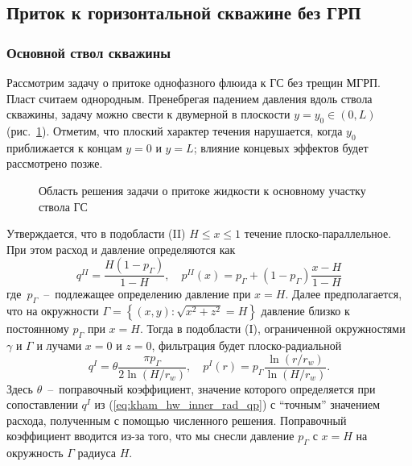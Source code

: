 \documentclass{article}
\begin{document}

\subsection{Приток к горизонтальной скважине без ГРП}

\subsubsection{Основной ствол скважины}

Рассмотрим задачу о притоке однофазного флюида к ГС без трещин МГРП. Пласт
считаем однородным. Пренебрегая падением давления вдоль ствола скважины,
задачу можно свести к двумерной в плоскости $y = y_0 \in \left(0, L\right)$
(рис.~\ref{fig:kham_hw_inner_scheme}). Отметим, что плоский характер течения
нарушается, когда $y_0$ приближается к концам $y = 0$ и $y = L$; влияние концевых
эффектов будет рассмотрено позже.

\begin{figure}[H]
	\centering
	
	\caption{Область решения задачи о притоке жидкости к основному участку ствола ГС}
	\label{fig:kham_hw_inner_scheme} %
\end{figure}

Утверждается, что в подобласти (II) $H \leq x \leq 1$ течение плоско-параллельное.
При этом расход и давление определяются как
\begin{equation}
	\displaystyle
	q^{II} = \dfrac{H \left(1-p_{\Gamma}\right)}{1-H}, \quad
	p^{II}(x) = p_{\Gamma} + (1 - p_{\Gamma})\dfrac{x - H}{1-H}
	\label{eq:kham_hw_inner_par_qp}
\end{equation}
где~$p_{\Gamma}$~--~подлежащее определению давление при $x=H$.
Далее предполагается, что на окружности
$\Gamma=\left\{\left(x,y\right): \sqrt{x^2 + z^2} = H \right\}$ %
давление близко к постоянному $p_{\Gamma}$ при $x=H$.
Тогда в подобласти (I), ограниченной окружностями $\gamma$ и $\Gamma$ и
лучами $x = 0$ и $z = 0$, фильтрация будет плоско-радиальной
\begin{equation}
	\displaystyle
	q^I = \theta \dfrac{\pi p_{\Gamma}}{2 \ln{\left(H/r_w\right)}}, \quad
	p^I(r) = p_{\Gamma} \dfrac{\ln{\left(r/r_w\right)}}{\ln{\left(H/r_w\right)}}.
	\label{eq:kham_hw_inner_rad_qp}
\end{equation}
Здесь $\theta$~--~поправочный коэффициент, значение которого определяется
при сопоставлении $q^I$ из (\ref{eq:kham_hw_inner_rad_qp}) с ``точным''
значением расхода, полученным с помощью численного решения. Поправочный
коэффициент вводится из-за того, что мы снесли давление $p_{\Gamma}$ с $x= H$
на окружность $\Gamma$ радиуса $H$.
\end{document}
